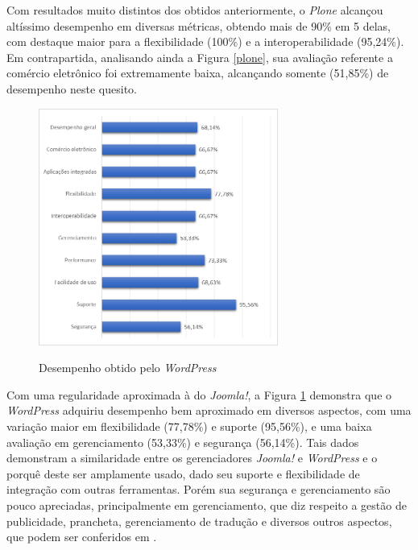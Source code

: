Com resultados muito distintos dos obtidos anteriormente, o \textit{Plone} alcançou altíssimo desempenho em diversas métricas, obtendo mais de 90\% em 5 delas, com destaque maior para a flexibilidade (100\%) e a interoperabilidade (95,24\%). Em contrapartida, analisando ainda a Figura \ref{plone}, sua avaliação referente a comércio eletrônico foi extremamente baixa, alcançando somente (51,85\%) de desempenho neste quesito. 
\newpage

\begin{figure}[htb]
 \centering
 \caption{Desempenho obtido pelo \textit{WordPress}}
 \includegraphics[width=0.7\textwidth]{figuras/desempenho-wordpress}
 \label{wordpress}
\end{figure}

Com uma regularidade aproximada à do \textit{Joomla!}, a Figura \ref{wordpress} demonstra que o \textit{WordPress} adquiriu desempenho bem aproximado em diversos aspectos, com uma variação maior em flexibilidade (77,78\%) e suporte (95,56\%), e uma baixa avaliação em gerenciamento (53,33\%) e segurança (56,14\%). Tais dados demonstram a similaridade entre os gerenciadores \textit{Joomla!} e \textit{WordPress} e o porquê deste ser amplamente usado, dado seu suporte e flexibilidade de integração com outras ferramentas. Porém sua segurança e gerenciamento são pouco apreciadas, principalmente em gerenciamento, que diz respeito a gestão de publicidade, prancheta, gerenciamento de tradução e diversos outros aspectos, que podem ser conferidos em .   
\newpage

